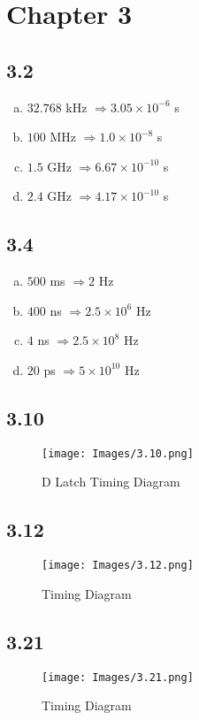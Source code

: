 \section*{Chapter 3}
\subsection*{3.2}
\begin{enumerate}[(a)]
    \item $32.768$ kHz $\Rightarrow3.05\times10^{-6}$ s
    \item $100$ MHz $\Rightarrow1.0\times10^{-8}$ s
    \item $1.5$ GHz $\Rightarrow6.67\times10^{-10}$ s
    \item $2.4$ GHz $\Rightarrow4.17\times10^{-10}$ s
\end{enumerate}

\subsection*{3.4}
\begin{enumerate}[(a)]
    \item $500$ ms $\Rightarrow2$ Hz
    \item $400$ ns $\Rightarrow2.5\times10^{6}$ Hz
    \item $4$ ns $\Rightarrow2.5\times10^{8}$ Hz
    \item $20$ ps $\Rightarrow5\times10^{10}$ Hz
\end{enumerate}

\clearpage
\subsection*{3.10}
\begin{figure}[!ht]
    \centering
    \texttt{[image: Images/3.10.png]}
    \caption{D Latch Timing Diagram}
\end{figure}

\subsection*{3.12}
\begin{figure}[!ht]
    \centering
    \texttt{[image: Images/3.12.png]}
    \caption{Timing Diagram}
\end{figure}

\subsection*{3.21}
\begin{figure}[!ht]
    \centering
    \texttt{[image: Images/3.21.png]}
    \caption{Timing Diagram}
\end{figure}

